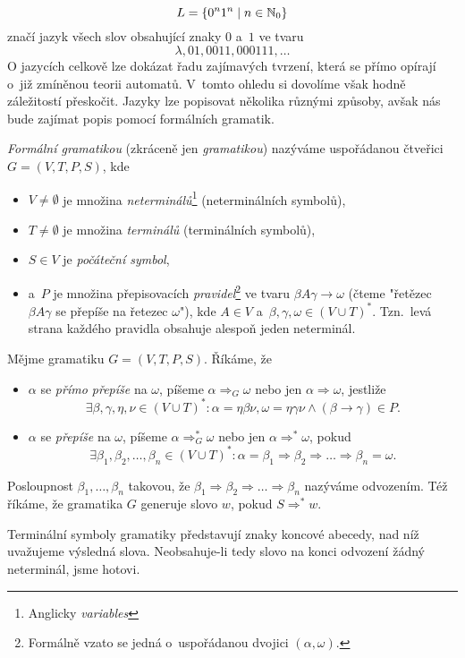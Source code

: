 \[L=\left\{0^n1^n\mid n\in\mathbb{N}_0\right\}\]
značí jazyk všech slov obsahující znaky $0$ a~$1$ ve tvaru
\[\lambda,01,0011,000111,\ldots\]
O jazycích celkově lze dokázat řadu zajímavých tvrzení, která se přímo opírají o~již zmíněnou teorii automatů. V~tomto ohledu si dovolíme však hodně záležitostí přeskočit. Jazyky lze popisovat několika různými způsoby, avšak nás bude zajímat popis pomocí formálních gramatik.
\begin{definition}\label{def:formalni-gramatika}
    \emph{Formální gramatikou} (zkráceně jen \emph{gramatikou}) nazýváme uspořádanou čtveřici $G=(V,T,P,S)$, kde
    \begin{itemize}
        \item $V\neq\emptyset$ je množina \emph{neterminálů}\footnote{Anglicky \emph{variables}} (neterminálních symbolů),
        \item $T\neq\emptyset$ je množina \emph{terminálů} (terminálních symbolů),
        \item $S\in V$ je \emph{počáteční symbol},
        \item a~$P$ je množina přepisovacích \emph{pravidel}\footnote{Formálně vzato se jedná o~uspořádanou dvojici $(\alpha,\omega)$.} ve tvaru $\beta A\gamma\to\omega$ (čteme "řetězec $\beta A\gamma$ se přepíše na řetezec $\omega$"), kde $A\in V$ a~$\beta,\gamma,\omega\in(V\cup T)^*$. Tzn.~levá strana každého pravidla obsahuje alespoň jeden neterminál.
    \end{itemize}
\end{definition}
\begin{definition}\label{def:odvozeni-slova-v-gramatice}
    Mějme gramatiku $G=(V,T,P,S)$. Říkáme, že
    \begin{itemize}
        \item $\alpha$ se \emph{přímo přepíše} na $\omega$, píšeme $\alpha\Rightarrow_G\omega$ nebo jen $\alpha\Rightarrow\omega$, jestliže
        \[\exists\beta,\gamma,\eta,\nu\in(V\cup T)^*: \alpha=\eta\beta\nu,\omega=\eta\gamma\nu\land(\beta\to\gamma)\in P.\]
        \item $\alpha$ se \emph{přepíše} na $\omega$, píšeme $\alpha\Rightarrow_G^*\omega$ nebo jen $\alpha\Rightarrow^*\omega$, pokud
        \[\exists\beta_1,\beta_2,\ldots,\beta_n\in(V\cup T)^*:\alpha=\beta_1\Rightarrow\beta_2\Rightarrow\dots\Rightarrow\beta_n=\omega.\]
    \end{itemize}
    Posloupnost $\beta_1,\ldots,\beta_n$ takovou, že $\beta_1\Rightarrow\beta_2\Rightarrow\dots\Rightarrow\beta_n$ nazýváme odvozením. Též říkáme, že gramatika $G$ generuje slovo $w$, pokud $S\Rightarrow^* w$.
\end{definition}
Terminální symboly gramatiky představují znaky koncové abecedy, nad níž uvažujeme výsledná slova. Neobsahuje-li tedy slovo na konci odvození žádný neterminál, jsme hotovi.

